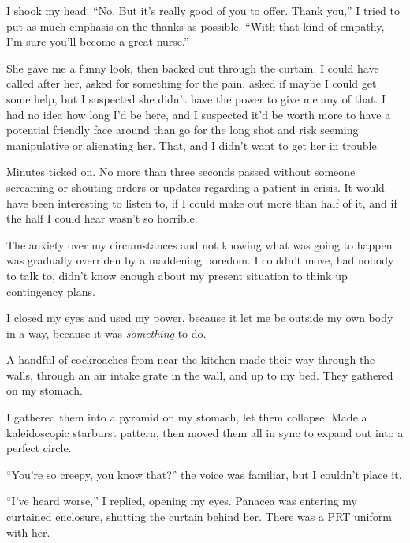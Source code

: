I shook my head.  ``No.  But it's really good of you to offer.  Thank you,'' I tried to put as much emphasis on the thanks as possible.  ``With that kind of empathy, I'm sure you'll become a great nurse.''



She gave me a funny look, then backed out through the curtain.  I could have called after her, asked for something for the pain, asked if maybe I could get some help, but I suspected she didn't have the power to give me any of that.  I had no idea how long I'd be here, and I suspected it'd be worth more to have a potential friendly face around than go for the long shot and risk seeming manipulative or alienating her.  That, and I didn't want to get her in trouble.



Minutes ticked on.  No more than three seconds passed without someone screaming or shouting orders or updates regarding a patient in crisis.  It would have been interesting to listen to, if I could make out more than half of it, and if the half I could hear wasn't so horrible.



The anxiety over my circumstances and not knowing what was going to happen was gradually overriden by a maddening boredom.   I couldn't move, had nobody to talk to, didn't know enough about my present situation to think up contingency plans.



I closed my eyes and used my power, because it let me be outside my own body in a way, because it was \emph{something} to do.



A handful of cockroaches from near the kitchen made their way through the walls, through an air intake grate in the wall, and up to my bed.  They gathered on my stomach.



I gathered them into a pyramid on my stomach, let them collapse.  Made a kaleidoscopic starburst pattern, then moved them all in sync to expand out into a perfect circle.



``You're so creepy, you know that?'' the voice was familiar, but I couldn't place it.



``I've heard worse,'' I replied, opening my eyes.  Panacea was entering my curtained enclosure, shutting the curtain behind her.  There was a PRT uniform with her.



